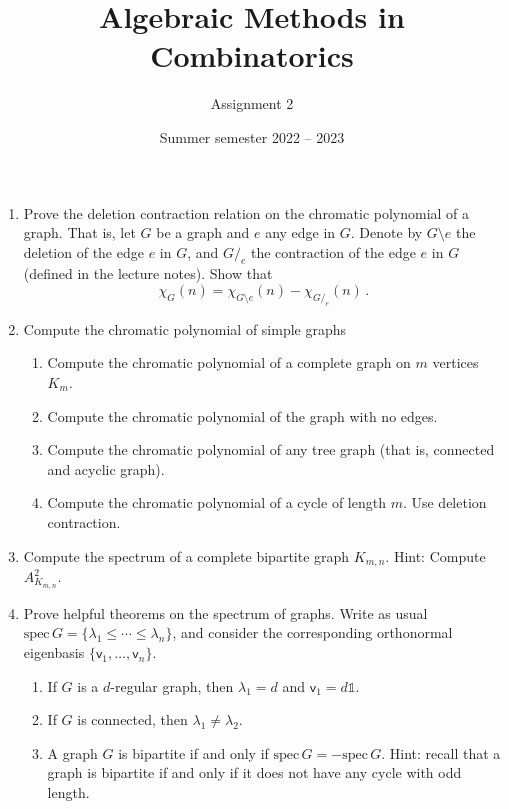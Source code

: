 \documentclass[kulak]{tplt}
\title{Algebraic Methods in Combinatorics}
\author{Assignment 2}
\date{Summer semester 2022 -- 2023}
\theoremstyle{definition}
\newcommand{\vv}{\mathsf{v}}
\newcommand{\spec}{\mathrm{spec}}
\begin{document}
\maketitle
\begin{enumerate}
\item Prove the deletion contraction relation on the chromatic polynomial of a graph.
That is, let $G$ be a graph and $e$ any edge in $G$.
Denote by $G\setminus e $ the deletion of the edge $e$ in $G$, and $G /_e$ the contraction of the edge $e$ in $G$ (defined in the lecture notes).
Show that
$$ \chi_G(n) = \chi_{G\setminus e}(n) - \chi_{G /_e}(n)\, . $$

\item Compute the chromatic polynomial of simple graphs

\begin{enumerate}
\item Compute the chromatic polynomial of a complete graph on $m$ vertices $K_m$.

\item Compute the chromatic polynomial of the graph with no edges.

\item Compute the chromatic polynomial of any tree graph (that is, connected and acyclic graph).

\item Compute the chromatic polynomial of a cycle of length $m$.
Use deletion contraction.
\end{enumerate}



\item Compute the spectrum of a complete bipartite graph $K_{m, n}$.
Hint: Compute $A_{K_{m, n}}^2$.



\item Prove helpful theorems on the spectrum of graphs.
Write as usual $\spec \, G = \{\lambda_1 \leq \cdots \leq \lambda_n \}$, and consider the corresponding orthonormal eigenbasis $\{\vv_1, \ldots, \vv_n\}$.


\begin{enumerate}
\item If $G$ is a $d$-regular graph, then $\lambda_1 = d$ and $\vv_1 = d\mathbb{1}$.

\item If $G$ is connected, then $\lambda_1 \neq \lambda_2$.

\item A graph $G$ is bipartite if and only if $\spec \, G = - \spec \, G$.
Hint: recall that a graph is bipartite if and only if it does not have any cycle with odd length.


\end{enumerate}
\end{enumerate}
\end{document}
